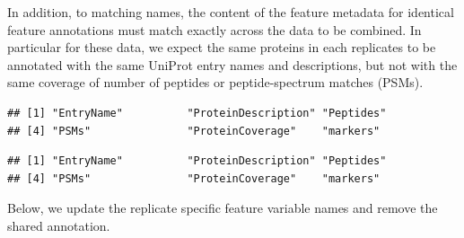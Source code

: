 In addition, to matching names, the content of the feature metadata
for identical feature annotations must match exactly across the data
to be combined. In particular for these data, we expect the same
proteins in each replicates to be annotated with the same UniProt
entry names and descriptions, but not with the same coverage of number
of peptides or peptide-spectrum matches (PSMs).

\begin{knitrout}
\color{fgcolor}\begin{kframe}
\begin{alltt}
\end{alltt}
\begin{verbatim}
## [1] "EntryName"          "ProteinDescription" "Peptides"          
## [4] "PSMs"               "ProteinCoverage"    "markers"
\end{verbatim}
\begin{alltt}
\end{alltt}
\begin{verbatim}
## [1] "EntryName"          "ProteinDescription" "Peptides"          
## [4] "PSMs"               "ProteinCoverage"    "markers"
\end{verbatim}
\end{kframe}
\end{knitrout}

Below, we update the replicate specific feature variable names and
remove the shared annotation.

